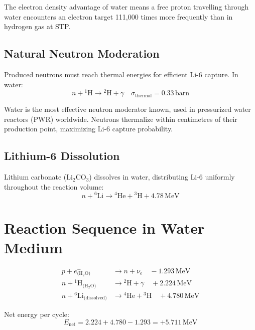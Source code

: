 \documentclass[12pt,a4paper]{article}
\begin{document}
The electron density advantage of water means a free proton
travelling through water encounters an electron target
111,000 times more frequently than in hydrogen gas at STP.

\subsection{Natural Neutron Moderation}

Produced neutrons must reach thermal energies for efficient
Li-6 capture. In water:
\begin{equation}
n + {}^1\text{H} \rightarrow {}^2\text{H} + \gamma
\quad \sigma_\text{thermal} = 0.33\,\text{barn}
\end{equation}

Water is the most effective neutron moderator known, used in
pressurized water reactors (PWR) worldwide. Neutrons thermalize
within centimetres of their production point, maximizing
Li-6 capture probability.

\subsection{Lithium-6 Dissolution}

Lithium carbonate (Li$_2$CO$_3$) dissolves in water, distributing
Li-6 uniformly throughout the reaction volume:
\begin{equation}
n + {}^6\text{Li} \rightarrow {}^4\text{He} + {}^3\text{H}
+ 4.78\,\text{MeV}
\end{equation}

\section{Reaction Sequence in Water Medium}

\begin{align}
p + e^-_\text{(H$_2$O)} &\rightarrow n + \nu_e
\quad -1.293\,\text{MeV} \tag{W1}\\
n + {}^1\text{H}_\text{(H$_2$O)} &\rightarrow {}^2\text{H} + \gamma
\quad +2.224\,\text{MeV} \tag{W2}\\
n + {}^6\text{Li}_\text{(dissolved)} &\rightarrow {}^4\text{He} + {}^3\text{H}
\quad +4.780\,\text{MeV} \tag{W3}
\end{align}

Net energy per cycle:
\begin{equation}
E_\text{net} = 2.224 + 4.780 - 1.293 = \boxed{+5.711\,\text{MeV}}
\end{equation}
\end{document}
